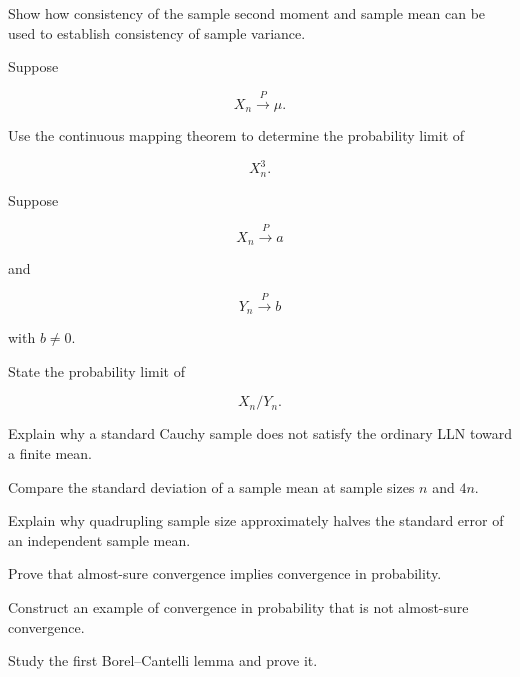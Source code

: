 \begin{exercise}[3]
Show how consistency of the sample second moment and sample mean can be
used to establish consistency of sample variance.
\end{exercise}

\begin{exercise}[3]
Suppose

\[
X_n\xrightarrow{P}\mu.
\]

Use the continuous mapping theorem to determine the probability limit
of

\[
X_n^3.
\]
\end{exercise}

\begin{exercise}[3]
Suppose

\[
X_n\xrightarrow{P}a
\]

and

\[
Y_n\xrightarrow{P}b
\]

with \(b\neq0\).

State the probability limit of

\[
X_n/Y_n.
\]
\end{exercise}

\begin{exercise}[3]
Explain why a standard Cauchy sample does not satisfy the ordinary LLN
toward a finite mean.
\end{exercise}

\begin{exercise}[3]
Compare the standard deviation of a sample mean at sample sizes \(n\)
and \(4n\).
\end{exercise}

\begin{exercise}[3]
Explain why quadrupling sample size approximately halves the standard
error of an independent sample mean.
\end{exercise}

\begin{exercise}[4]
Prove that almost-sure convergence implies convergence in probability.
\end{exercise}

\begin{exercise}[4]
Construct an example of convergence in probability that is not
almost-sure convergence.
\end{exercise}

\begin{exercise}[4]
Study the first Borel--Cantelli lemma and prove it.
\end{exercise}

